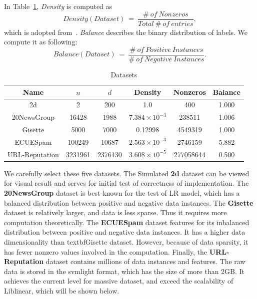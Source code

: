 \documentclass[10pt, conference, compsocconf]{IEEEtran}
\begin{document}
In Table~\ref{tab:table1}, \textit{Density} is computed as
\[
Density(Dataset)~=~\frac{\#~of~Nonzeros}{Total~\#~of~entries},
\]
which is adopted from~\cite{sarwar2001item}.
\textit{Balance} describes the binary distribution of labels.
We compute it as following:
\[
Balance(Dataset)~=~\frac{\#~of~Positive~Instances}{\#~of~Negative~Instances}.
\]
\begin{table}[h]
\centering
\caption{Datasets}\label{tab:table1}
\begin{tabular}{|c|c|c|c|c|c|}
\hline
    Name           & $n$ & $d$ & Density & Nonzeros & Balance \\
\hline
    2d             & 2             & 200            & 1.0                  & 400                 & 1.000 \\
\hline
    20NewsGroup    & 16428         & 1988           & $7.384\times10^{-3}$ & 238511              & 1.006 \\
\hline
    Gisette        & 5000          & 7000           & 0.12998              & 4549319             & 1.000 \\
\hline
    ECUESpam       & 100249        & 10687          & $2.563\times10^{-3}$ & 2746159             & 5.882 \\
\hline
    URL-Reputation & 3231961       & 2376130        & $3.608\times10^{-5}$ & 277058644           & 0.500 \\
\hline
\end{tabular}
\end{table}
We carefully select these five datasets.
The Simulated \textbf{2d} dataset can be viewed for visual result and serves for initial test of correctness of implementation.
The \textbf{20NewsGroup} dataset is best-known for the test of LR model, which has a balanced distribution between positive and negative data instances.
The \textbf{Gisette} dataset is relatively larger, and data is less sparse. Thus it requires more computation theoretically.
The \textbf{ECUESpam} dataset features for its inbalanced distribution between positive and negative data instances. It has a higher data dimensionality than textbf{Gisette} dataset. However, because of data sparsity, it has fewer nonzero values involved in the computation.
Finally, the \textbf{URL-Reputation} dataset contains millions of data instances and features. The raw data is stored in the svmlight format, which has the size of more than 2GB. It achieves the current level for massive dataset, and exceed the scalability of Liblinear, which will be shown below.
\end{document}

